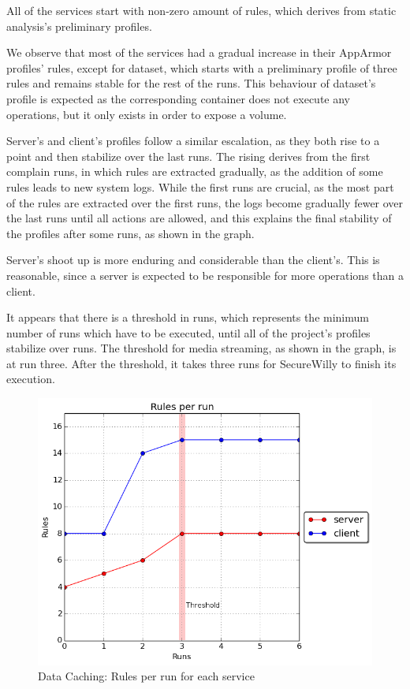 All of the services start with non-zero amount of rules, which derives from static analysis's preliminary profiles.

We observe that most of the services had a gradual increase in their AppArmor profiles' rules, except for dataset, which starts with a preliminary profile of three rules and remains stable for the rest of the runs. This behaviour of dataset's profile is expected as the corresponding container does not execute any operations, but it only exists in order to expose a volume.

Server's and client's profiles follow a similar escalation, as they both rise to a point and then stabilize over the last runs. The rising derives from the first complain runs, in which rules are extracted gradually, as the addition of some rules leads to new system logs. While the first runs are crucial, as the most part of the rules are extracted over the first runs, the logs become gradually fewer over the last runs until all actions are allowed, and this explains the final stability of the profiles after some runs, as shown in the graph.

Server's shoot up is more enduring and considerable than the client's. This is reasonable, since a server is expected to be responsible for more operations than a client.  

It appears that there is a threshold in runs, which represents the minimum number of runs which have to be executed, until all of the project's profiles stabilize over runs. The threshold for media streaming, as shown in the graph, is at run three. After the threshold, it takes three runs for SecureWilly to finish its execution.

\begin{figure}[h!]
  \centering
   \includegraphics[width=0.70\linewidth]{../figures/datacaching/rulesthreshold.png}
   \caption{Data Caching: Rules per run for each service}
\end{figure}

